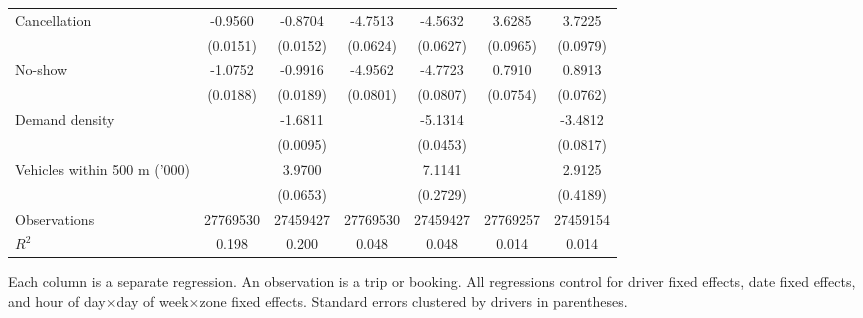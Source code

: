 \documentclass[reviewmode,AEJ]{AEA}
\begin{document}
\begin{table}
{\begin{tabularx}{\textwidth}{l@{\extracolsep{\fill}}*{6}{S}}
		\midrule
		Cancellation        &     -0.9560&     -0.8704&     -4.7513&     -4.5632&      3.6285&      3.7225\\
		                    &    (0.0151)         &    (0.0152)         &    (0.0624)         &    (0.0627)         &    (0.0965)         &    (0.0979)         \\
		\addlinespace
		No-show             &     -1.0752&     -0.9916&     -4.9562&     -4.7723&      0.7910&      0.8913\\
		                    &    (0.0188)         &    (0.0189)         &    (0.0801)         &    (0.0807)         &    (0.0754)         &    (0.0762)         \\
		\addlinespace
		Demand density      &                     &     -1.6811&                     &     -5.1314&                     &     -3.4812\\
		                    &                     &    (0.0095)         &                     &    (0.0453)         &                     &    (0.0817)         \\
		\addlinespace
		Vehicles within 500 m ('000)&                     &      3.9700&                     &      7.1141&                     &      2.9125\\
		                    &                     &    (0.0653)         &                     &    (0.2729)         &                     &    (0.4189)         \\
		\addlinespace
		Observations        &\num{27769530}         &\num{27459427}         &\num{27769530}         &\num{27459427}         &\num{27769257}         &\num{27459154}         \\
		\(R^2\)             &     {0.198}         &     {0.200}         &     {0.048}         &     {0.048}         &     {0.014}         &     {0.014}         \\
		\bottomrule
		\end{tabularx}
		}
		
		\begin{tablenotes}
			Each column is a separate regression. An observation is a trip or booking. All regressions control for driver fixed effects, date fixed effects, and hour of day\(\times\)day of week\(\times\)zone fixed effects. Standard errors clustered by drivers in parentheses. 
		\end{tablenotes}
\end{table}
\end{document}
